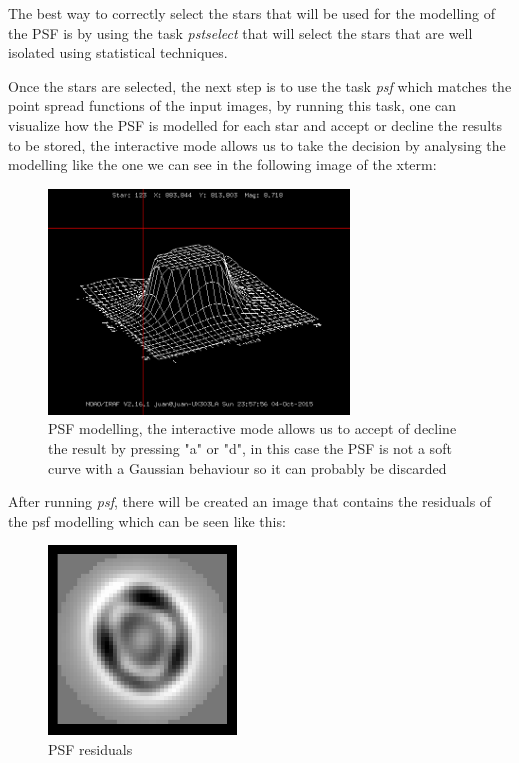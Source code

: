 The best way to correctly select the stars that will be used for the modelling of the PSF is by using the task \textit{pstselect} that will select the stars that are well isolated using statistical techniques. 

Once the stars are selected, the next step is to use the task \textit{psf} which matches the point spread functions of the input images, by running this task, one can visualize how the PSF is modelled for each star and accept or decline the results to be stored, the interactive mode allows us to take the decision by analysing the modelling like the one we can see in the following image of the xterm:

\begin{figure}[H]
\centering
\includegraphics[width=8cm]{images/psf.png}
\caption[PSF modelling]{PSF modelling, the interactive mode allows us to accept of decline the result by pressing "a" or "d", in this case the PSF is not a soft curve with a Gaussian behaviour so it can probably be discarded}
\end{figure}

After running \textit{psf}, there will be created an image that contains the residuals of the psf modelling which can be seen like this:

\begin{figure}[H]
\centering
\includegraphics[width=5cm]{images/psf2.png}
\caption[PSF residuals]{PSF residuals}
\end{figure}

